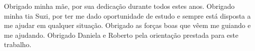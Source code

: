 Obrigado minha mãe, por sua dedicação durante todos estes anos. Obrigado minha tia Suzi, por ter me dado oportunidade de estudo e sempre está disposta a me ajudar em qualquer situação. Obrigado as forças boas que vêem me guiando e me ajudando. Obrigado Daniela e Roberto pela orientação prestada para este trabalho.

